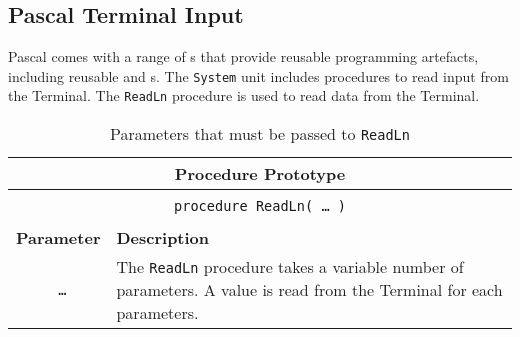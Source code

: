 \clearpage
\subsection{Pascal Terminal Input} %
\label{sub:pascal_terminal_input}

Pascal comes with a range of s that provide reusable programming artefacts, including reusable  and s. The \texttt{System} unit includes procedures to read input from the Terminal. The \texttt{ReadLn} procedure is used to read data from the Terminal.

\begin{table}[h]
  \centering
  \begin{tabular}{|c|p{9cm}|}
    \hline
    \multicolumn{2}{|c|}{\textbf{Procedure Prototype}} \\
    \hline
    \multicolumn{2}{|c|}{} \\
    \multicolumn{2}{|c|}{\texttt{procedure ReadLn( {\ldots} )}} \\
    \multicolumn{2}{|c|}{} \\
    \hline
    \hline
    \textbf{Parameter} & \textbf{Description} \\
    \hline
    \texttt{ \ldots } & The \texttt{ReadLn} procedure takes a variable number of parameters. A value is read from the Terminal for each parameters. \\
    \hline
  \end{tabular}
  \caption{Parameters that must be passed to \texttt{ReadLn}}
  \label{tbl:readln parameters}
\end{table}


